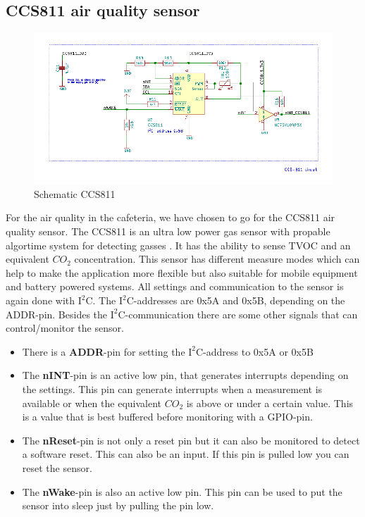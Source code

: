 \documentclass[11pt,a4paper]{article}
\begin{document}
\subsection{CCS811 air quality sensor}
\begin{figure}[H]
	\centering
	\includegraphics[width=0.8\linewidth]{Schematic_CCS811.png}
	\caption{Schematic CCS811}
	\label{fig:CCS811}
\end{figure}
For the air quality in the cafeteria, we have chosen to go for the CCS811 air quality sensor. The CCS811 is an ultra low power gas sensor with propable algortime system for detecting gasses \cite{bib:CCS811}. It has the ability to sense TVOC and an equivalent $CO_{2}$ concentration. This sensor has different measure modes which can help to make the application more flexible but also suitable for mobile equipment and battery powered systems. All settings and communication to the sensor is again done with $\text{I}^2$C. The $\text{I}^2$C-addresses are 0x5A and 0x5B, depending on the ADDR-pin. Besides the $\text{I}^2$C-communication there are some other signals that can control/monitor the sensor. 
\begin{itemize}
	\item There is a \textbf{ADDR}-pin for setting the $\text{I}^2$C-address to 0x5A or 0x5B
	\item The\textbf{ nINT}-pin is an active low pin, that generates interrupts depending on the settings. This pin can generate interrupts when a measurement is available or when the equivalent $CO_{2}$ is above or under a certain value. This is a value that is best buffered before monitoring with a GPIO-pin.
	\item The \textbf{nReset}-pin is not only a reset pin but it can also be monitored to detect a software reset. This can also be an input. If this pin is pulled low you can reset the sensor.
	\item The \textbf{nWake}-pin is also an active low pin. This pin can be used to put the sensor into sleep just by pulling the pin low.
\end{itemize}
\end{document}
